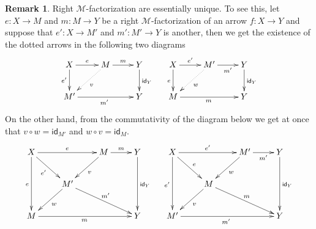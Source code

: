 \documentclass[a4paper]{article}
\newcommand{\id}[1]{\mathsf{id}_{#1}}
\theoremstyle{definition}
\newtheorem{remark}[theorem]{Remark}
\begin{document}
\begin{remark}\label{rem:uniq}
	Right $\mathcal{M}$-factorization are essentially unique. To see this, let $e\colon X\to M$ and $m\colon M\to Y$ be a right $\mathcal{M}$-factorization of an arrow $f\colon X\to Y$ and suppose that  $e'\colon X\to M'$ and $m'\colon M'\to Y$ is another, then we  get the existence of the dotted arrows in the following two diagrams
	\[\xymatrix{X \ar[r]^-{e}  \ar[d]_-{e'}& M \ar[r]^-{m} \ar@{.>}[dl]^{v} & Y \ar[d]^{\id{Y}} & X \ar[r]^-{e'}  \ar[d]_{e}& M' \ar[r]_-{m'} \ar@{.>}[dl]^{w} & Y \ar[d]^{\id{Y}}\\M' \ar[rr]_{m'} && Y & M \ar[rr]_{m} && Y}\] 
	On the other hand, from the commutativity of the diagram below we get at once that $v\circ w=\id{M'}$ and $w\circ v=\id{M}$.
	\[\xymatrix{X \ar[rr]^-{e}  \ar[dr]_-{e'} \ar[dd]_{e}&& M \ar[r]^-{m} \ar[dl]^{v} & Y \ar[dd]^{\id{Y}} & X \ar[dr]^{e} \ar[rr]^-{e'}  \ar[dd]_{e'}&& M' \ar[r]_-{m'} \ar[dl]^{w} &Y \ar[dd]^{\id{Y}}\\ & M' \ar[dl]^{w}  \ar[drr]^{m'} &&&&M\ar[dl]^{v} \ar[drr]^{m}\\M \ar[rrr]_{m} &&& Y & M' \ar[rrr]_{m'} &&& Y}\] 
\end{remark}
\end{document}
